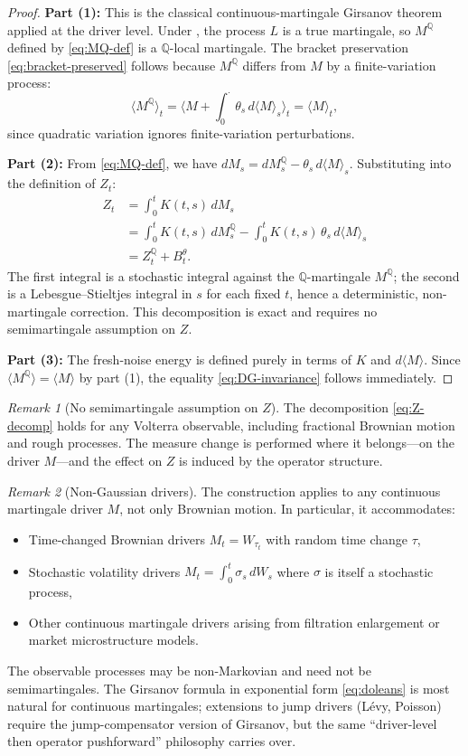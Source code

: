 \documentclass[11pt]{article}
\theoremstyle{plain}
\theoremstyle{definition}
\theoremstyle{remark}
\newtheorem{remark}{Remark}[section]
\newcommand{\QQ}{\mathbb{Q}}
\newcommand{\bracket}[1]{\langle #1 \rangle}
\begin{document}
\begin{proof}
\textbf{Part (1):} This is the classical continuous-martingale Girsanov theorem
applied at the driver level. Under , the process $L$ is a
true martingale, so $M^{\QQ}$ defined by \eqref{eq:MQ-def} is a $\QQ$-local
martingale. The bracket preservation \eqref{eq:bracket-preserved} follows
because $M^{\QQ}$ differs from $M$ by a finite-variation process:
\[
\bracket{M^{\QQ}}_t = \bracket{M + \int_0^\cdot \theta_s\,d\bracket{M}_s}_t
= \bracket{M}_t,
\]
since quadratic variation ignores finite-variation perturbations.

\textbf{Part (2):} From \eqref{eq:MQ-def}, we have
$dM_s = dM_s^{\QQ} - \theta_s\,d\bracket{M}_s$. Substituting into the
definition of $Z_t$:
\begin{align*}
Z_t &= \int_0^t K(t,s)\,dM_s \\
&= \int_0^t K(t,s)\,dM_s^{\QQ} - \int_0^t K(t,s)\,\theta_s\,d\bracket{M}_s \\
&= Z_t^{\QQ} + B_t^\theta.
\end{align*}
The first integral is a stochastic integral against the $\QQ$-martingale
$M^{\QQ}$; the second is a Lebesgue--Stieltjes integral in $s$ for each
fixed $t$, hence a deterministic, non-martingale correction. This
decomposition is exact and requires no semimartingale assumption on $Z$.

\textbf{Part (3):} The fresh-noise energy is defined purely in terms of
$K$ and $d\bracket{M}$. Since $\bracket{M^{\QQ}} = \bracket{M}$ by part (1),
the equality \eqref{eq:DG-invariance} follows immediately.
\end{proof}

\begin{remark}[No semimartingale assumption on $Z$]
The decomposition \eqref{eq:Z-decomp} holds for any Volterra observable,
including fractional Brownian motion and rough processes. The measure change
is performed where it belongs---on the driver $M$---and the effect on $Z$
is induced by the operator structure.
\end{remark}

\begin{remark}[Non-Gaussian drivers]\label{rem:non-gaussian}
The construction applies to any continuous martingale driver $M$, not only
Brownian motion. In particular, it accommodates:
\begin{itemize}
\item Time-changed Brownian drivers $M_t = W_{\tau_t}$ with random time change $\tau$,
\item Stochastic volatility drivers $M_t = \int_0^t \sigma_s\,dW_s$ where $\sigma$ is
itself a stochastic process,
\item Other continuous martingale drivers arising from filtration enlargement or
market microstructure models.
\end{itemize}
The observable processes may be non-Markovian and need not be
semimartingales. The Girsanov formula in exponential form \eqref{eq:doleans}
is most natural for continuous martingales; extensions to jump drivers (L\'evy,
Poisson) require the jump-compensator version of Girsanov, but the same
``driver-level then operator pushforward'' philosophy carries over.
\end{remark}
\end{document}
